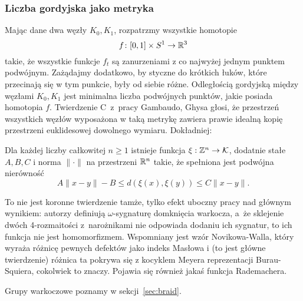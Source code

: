 
\subsubsection{Liczba gordyjska jako metryka}
Mając dane dwa węzły $K_0, K_1$, rozpatrzmy wszystkie homotopie
\begin{equation}
    f \colon [0,1] \times S^1 \to \mathbb R^3
\end{equation}
takie, że wszystkie funkcje $f_t$ są zanurzeniami z co najwyżej jednym punktem podwójnym.
Zażądajmy dodatkowo, by styczne do krótkich łuków, które przecinają się w tym punkcie, były od siebie różne.
Odległością gordyjską między węzłami $K_0, K_1$ jest minimalna liczba podwójnych punktów, jakie posiada homotopia $f$.
Twierdzenie C~z~pracy Gambaudo, Ghysa \cite{gambaudo2005} głosi, że przestrzeń wszystkich węzłów wyposażona w taką metrykę zawiera prawie idealną kopię przestrzeni euklidesowej dowolnego wymiaru.
%
%
Dokładniej:

\begin{proposition}
    Dla każdej liczby całkowitej $n \ge 1$ istnieje funkcja $\xi: \mathbb Z^n \to \mathcal{K}$, dodatnie stałe $A, B, C$ i norma $\|\cdot\|$ na przestrzeni $\mathbb R^n$ takie, że spełniona jest podwójna nierówność
    \begin{equation}
        A\|x-y\| - B \le d(\xi(x), \xi(y)) \le C\|x-y\|.
    \end{equation}
\end{proposition}

To nie jest koronne twierdzenie tamże, tylko efekt uboczny pracy nad głównym wynikiem: autorzy definiują $\omega$-sygnaturę domknięcia warkocza, a~że sklejenie dwóch 4-rozmaitości z~narożnikami nie odpowiada dodaniu ich sygnatur, to ich funkcja nie jest homomorfizmem.
%
Wspomniany jest wzór Novikowa-Walla, który wyraża różnicę pewnych defektów jako indeks Masłowa i (to jest główne twierdzenie) różnica ta pokrywa się z kocyklem Meyera reprezentacji Burau-Squiera, cokolwiek to znaczy.
Pojawia się również jakaś funkcja Rademachera.
%
%
%
%
%

Grupy warkoczowe poznamy w sekcji~\ref{sec:braid}.

